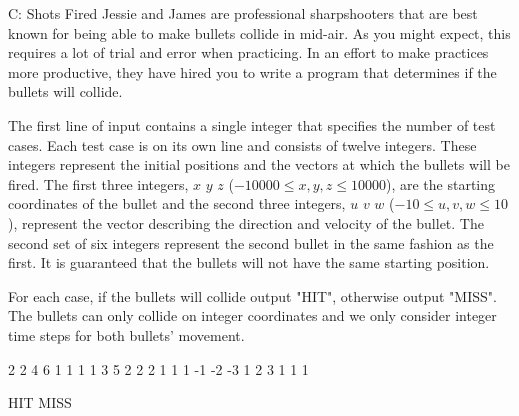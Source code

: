 \begin{problem}{C: Shots Fired}
Jessie and James are professional sharpshooters that are best known for being able to make bullets collide in mid-air.
As you might expect, this requires a lot of trial and error when practicing.
In an effort to make practices more productive, they have hired you to write a program that determines if the bullets will collide.
\end{problem}

\begin{formalin}
The first line of input contains a single integer that specifies the number of test cases.
Each test case is on its own line and consists of twelve integers.
These integers represent the initial positions and the vectors at which the bullets will be fired.
The first three integers, $x$ $y$ $z$ ($-10000 \leq x, y, z \leq 10000$), are the starting coordinates of the bullet and the second three integers, $u$ $v$ $w$ ($-10 \leq u, v, w \leq 10$), represent the vector describing the direction and velocity of the bullet.
The second set of six integers represent the second bullet in the same fashion as the first.
It is guaranteed that the bullets will not have the same starting position.
\end{formalin}

\begin{formalout}
For each case, if the bullets will collide output "HIT", otherwise output "MISS".
The bullets can only collide on integer coordinates and we only consider integer time steps for both bullets' movement. 
\end{formalout}

\begin{datain}
2
2 4 6 1 1 1 1 3 5 2 2 2
1 1 1 -1 -2 -3 1 2 3 1 1 1
\end{datain}

\begin{dataout}
HIT
MISS
\end{dataout}

